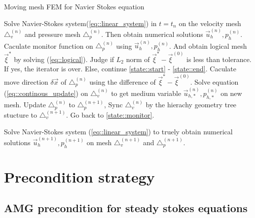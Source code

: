 \documentclass[a4paper, 11pt]{article}
\begin{document}
   \begin{algorithm}
     \caption{Moving mesh FEM for Navier Stokes equation}
     \begin{algorithmic}[1]
             \State Solve Navier-Stokes
                    system(\ref{eq::linear_system}) in $t = t_n$ on the
                    velocity mesh $\triangle_v^{(n)}$ and pressure mesh
                    $\triangle_p^{(n)}$. Then obtain numerical solutions
                    $\vec{u}_h^{(n)}, p_h^{(n)}$.
             \State Caculate monitor function on $\triangle_p^{(n)}$
                    using $\vec{u}_h^{(n)}, p_h^{(n)}$. And obtain
                    logical mesh $\vec{\xi}^*$ by solving
                    (\ref{eq::logical}). \label{state::monitor}
             \State Judge if $L_2$ norm of $\vec{\xi}^* -
                    \vec{\xi}^{(0)}$ is less than tolerance. If yes,
                    the iterator is over. Else, continue
                    \ref{state::start} - \ref{state::end}.
             \State Caculate move direction $\delta \vec{x}$ of
                    $\triangle_p^{(n)}$ using the difference of
                    $\vec{\xi}^* - \vec{\xi}^{(0)}$. 
                    \label{state::start}
             \State Solve equation (\ref{eq::continous_update}) on
                    $\triangle_v^{(n)}$ to get medium variable 
                    $\vec{u}_{h, *}^{(n)}, p_{h, *}^{(n)}$ on new
                    mesh.
             \State Update $\triangle_p^{(n)}$ to $\triangle_p^{(n + 1)}$, Sync
                    $\triangle_v^{(n)}$ by the hierachy geometry tree
                    stucture to $\triangle_v^{(n + 1)}$.
             \State Go back to \ref{state::monitor}. \label{state::end}       
             
             \State Solve Navier-Stokes system
                    (\ref{eq::linear_system}) to truely obtain numerical
                    solutions $\vec{u}_h^{(n + 1)}, p_h^{(n + 1)}$ on
                    mesh $\triangle_v^{(n + 1)}$ and $\triangle_p^{(n
                      + 1)}$.
        \EndWhile     
     \end{algorithmic}
     \label{alg::solve}
   \end{algorithm}
   
   \section{Precondition strategy}
   
   \subsection{AMG precondition for steady stokes equations}
   
\end{document}
